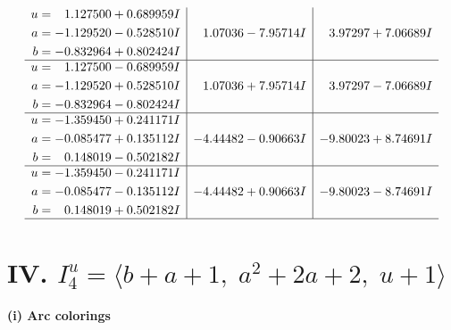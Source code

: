 \documentclass[1p]{elsarticle_modified}
\theoremstyle{definition}
\begin{document}
$$\begin{array}{c|c|c}
\begin{aligned}
u &= \phantom{-}1.127500 + 0.689959 I \\
a &= -1.129520 - 0.528510 I \\
b &= -0.832964 + 0.802424 I\end{aligned}
 & \phantom{-}1.07036 - 7.95714 I & \phantom{-}3.97297 + 7.06689 I \\ \hline\begin{aligned}
u &= \phantom{-}1.127500 - 0.689959 I \\
a &= -1.129520 + 0.528510 I \\
b &= -0.832964 - 0.802424 I\end{aligned}
 & \phantom{-}1.07036 + 7.95714 I & \phantom{-}3.97297 - 7.06689 I \\ \hline\begin{aligned}
u &= -1.359450 + 0.241171 I \\
a &= -0.085477 + 0.135112 I \\
b &= \phantom{-}0.148019 - 0.502182 I\end{aligned}
 & -4.44482 - 0.90663 I & -9.80023 + 8.74691 I \\ \hline\begin{aligned}
u &= -1.359450 - 0.241171 I \\
a &= -0.085477 - 0.135112 I \\
b &= \phantom{-}0.148019 + 0.502182 I\end{aligned}
 & -4.44482 + 0.90663 I & -9.80023 - 8.74691 I\\
 \hline 
 \end{array}$$\newpage\newpage\renewcommand{\arraystretch}{1}
\centering \section*{IV. $I^u_{4}= \langle b+a+1,\;a^2+2 a+2,\;u+1 \rangle$}
\flushleft \textbf{(i) Arc colorings}\\
\end{document}
